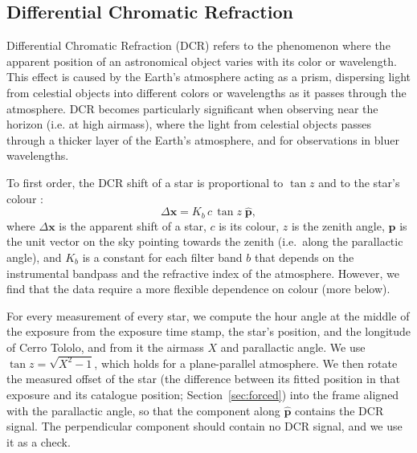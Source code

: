 \documentclass[usenatbib]{mnras}   %
\begin{document}
\subsection{Differential Chromatic Refraction} \label{sec:dcr}


Differential Chromatic Refraction (DCR) refers to the phenomenon where the apparent position of an astronomical object varies with its color or wavelength. This effect is caused by the Earth's atmosphere acting as a prism, dispersing light from celestial objects into different colors or wavelengths as it passes through the atmosphere. DCR becomes particularly significant when observing near the horizon (i.e. at high airmass), where the light from celestial objects passes through a thicker layer of the Earth's atmosphere, and for observations in bluer wavelengths.

To first order, the DCR shift of a star is proportional to $\tan z$ and to the star's colour \citep{Bernstein_2017}:
\begin{equation}
    \Delta \mathbf{x} = K_b \, c \, \tan z \; \hat{\mathbf{p}},
    \label{eq:dcr_linear}
\end{equation}
where $\Delta \mathbf{x}$ is the apparent shift of a star, $c$ is its colour, $z$ is the zenith angle, $\hat{\mathbf{p}}$ is the unit vector on the sky pointing towards the zenith (i.e.\ along the parallactic angle), and $K_b$ is a constant for each filter band $b$ that depends on the instrumental bandpass and the refractive index of the atmosphere. However, we find that the data require a more flexible dependence on colour (more below).

For every measurement of every star, we compute the hour angle at the middle of the exposure from the exposure time stamp, the star's position, and the longitude of Cerro Tololo, and from it the airmass $X$ and parallactic angle. We use $\tan z = \sqrt{X^2 - 1}$, which holds for a plane-parallel atmosphere. We then rotate the measured offset of the star (the difference between its fitted position in that exposure and its catalogue position; Section~\ref{sec:forced}) into the frame aligned with the parallactic angle, so that the component along $\hat{\mathbf{p}}$ contains the DCR signal. The perpendicular component should contain no DCR signal, and we use it as a check.
\end{document}
